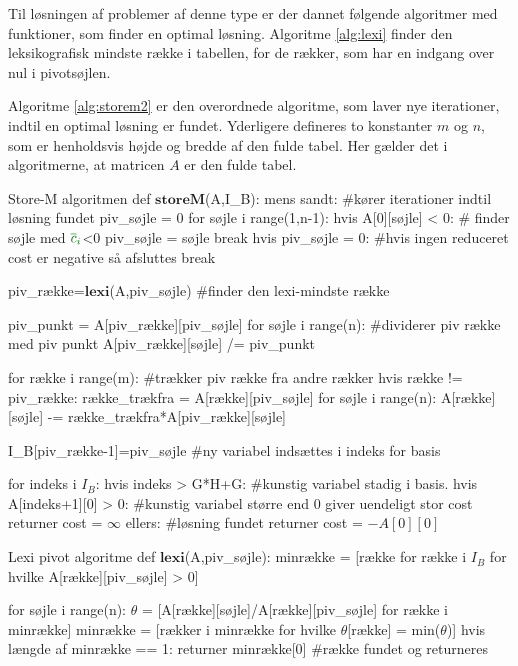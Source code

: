 Til løsningen af problemer af denne type er der dannet følgende algoritmer med funktioner, som finder en optimal løsning. Algoritme \ref{alg:lexi} finder den leksikografisk mindste række i tabellen, for de rækker, som har en indgang over nul i pivotsøjlen. 

Algoritme \ref{alg:storem2} er den overordnede algoritme, som laver nye iterationer, indtil en optimal løsning er fundet. Yderligere defineres to konstanter $m$ og $n$, som er henholdsvis højde og bredde af den fulde tabel. Her gælder det i algoritmerne, at matricen $A$ er den fulde tabel.

\newpage

\begin{alg}[label={alg:storem2}]{Store-M algoritmen}
def $\textbf{storeM}$(A,I_B):
    mens sandt: #kører iterationer indtil løsning fundet
    	piv_søjle = 0
    	for søjle i range(1,n-1): 
        	hvis A[0][søjle] < 0: # finder søjle med ${\color{commentgreen} \overline{c}_i}$<0
            	piv_søjle = søjle
            	break
		hvis piv_søjle = 0: #hvis ingen reduceret cost er negative så afsluttes
			break
            
    	piv_række=$\textbf{lexi}$(A,piv_søjle) #finder den lexi-mindste række
            
    	piv_punkt = A[piv_række][piv_søjle] 
    	for søjle i range(n): #dividerer piv række med piv punkt
        	A[piv_række][søjle] /= piv_punkt
            
    	for række i range(m): #trækker piv række fra andre rækker
        	hvis række != piv_række:
            	række_trækfra = A[række][piv_søjle]
            	for søjle i range(n):
                	A[række][søjle] -= række_trækfra*A[piv_række][søjle]

    	I_B[piv_række-1]=piv_søjle #ny variabel indsættes i indeks for basis

	for indeks i $I_B$: 
		hvis indeks > G*H+G: #kunstig variabel stadig i basis. 
			hvis A[indeks+1][0] > 0: #kunstig variabel større end 0 giver uendeligt stor cost
				returner cost = $\infty$
	ellers: #løsning fundet
		returner cost = $-A[0][0]$
\end{alg}

\begin{alg}[label={alg:lexi}]{Lexi pivot algoritme}
def $\textbf{lexi}$(A,piv_søjle):
	minrække = [række for række i $I_B$ for hvilke A[række][piv_søjle] > 0]
	
	for søjle i range(n):
		$\theta$ = [A[række][søjle]/A[række][piv_søjle] for række i minrække]
		minrække = [rækker i minrække for hvilke $\theta$[række] = min($\theta$)]
		hvis længde af minrække == 1:
			returner minrække[0] #række fundet og returneres
\end{alg}




